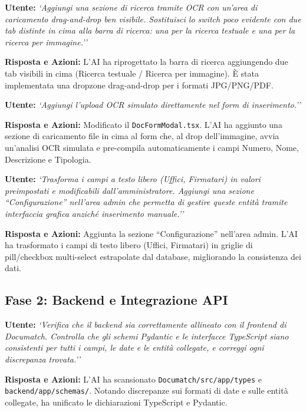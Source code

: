 \documentclass[12pt,a4paper,oneside]{report}
\begin{document}
\begin{promptbox}[title={Prompt 2 --- Ricerca OCR per Immagine}]
\textbf{Utente:} \textit{`Aggiungi una sezione di ricerca tramite OCR con un'area di caricamento drag-and-drop ben visibile. Sostituisci lo switch poco evidente con due tab distinte in cima alla barra di ricerca: una per la ricerca testuale e una per la ricerca per immagine.''}

\textbf{Risposta e Azioni:} L'AI ha riprogettato la barra di ricerca aggiungendo due tab visibili in cima (Ricerca testuale / Ricerca per immagine). È stata implementata una dropzone drag-and-drop per i formati JPG/PNG/PDF.
\end{promptbox}

\begin{promptbox}[title={Prompt 3 --- Integrazione OCR nel Form Admin}]
\textbf{Utente:} \textit{`Aggiungi l'upload OCR simulato direttamente nel form di inserimento.''}

\textbf{Risposta e Azioni:} Modificato il \texttt{DocFormModal.tsx}. L'AI ha aggiunto una sezione di caricamento file in cima al form che, al drop dell'immagine, avvia un'analisi OCR simulata e pre-compila automaticamente i campi Numero, Nome, Descrizione e Tipologia.
\end{promptbox}

\begin{promptbox}[title={Prompt 4 --- Configurazione Dinamica Metadati}]
\textbf{Utente:} \textit{`Trasforma i campi a testo libero (Uffici, Firmatari) in valori preimpostati e modificabili dall'amministratore. Aggiungi una sezione ``Configurazione'' nell'area admin che permetta di gestire queste entità tramite interfaccia grafica anziché inserimento manuale.''}

\textbf{Risposta e Azioni:} Aggiunta la sezione ``Configurazione'' nell'area admin. L'AI ha trasformato i campi di testo libero (Uffici, Firmatari) in griglie di pill/checkbox multi-select estrapolate dal database, migliorando la consistenza dei dati.
\end{promptbox}

\subsection{Fase 2: Backend e Integrazione API}

\begin{promptbox}[title={Prompt 5 --- Allineamento Tipi Backend/Frontend}]
\textbf{Utente:} \textit{`Verifica che il backend sia correttamente allineato con il frontend di Documatch. Controlla che gli schemi Pydantic e le interfacce TypeScript siano consistenti per tutti i campi, le date e le entità collegate, e correggi ogni discrepanza trovata.''}

\textbf{Risposta e Azioni:} L'AI ha scansionato \texttt{Documatch/src/app/types} e \texttt{backend/app/schemas/}. Notando discrepanze sui formati di date e sulle entità collegate, ha unificato le dichiarazioni TypeScript e Pydantic.
\end{promptbox}
\end{document}
